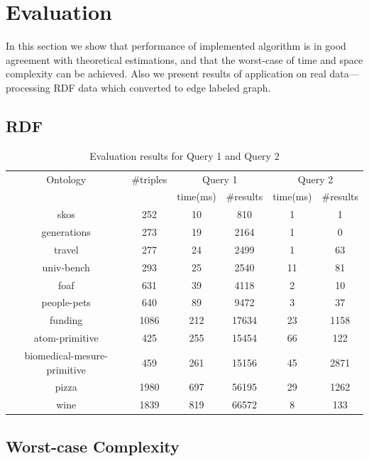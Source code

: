 \section{Evaluation}

In this section we show that performance of implemented algorithm is in good agreement with theoretical estimations, and that the worst-case of time and space complexity can be achieved. Also we present results of application on real data---processing RDF data which converted to edge labeled graph.

\subsection{RDF}

\begin{table}
\centering
\caption{Evaluation results for Query 1 and Query 2}
\label{tbl1}

\begin{tabular}{ | c | c | c | c | c | c |}
\hline
Ontology & \#triples & \multicolumn{2}{|c|}{Query 1} & \multicolumn{2}{|c|}{Query 2} \\
\cline{3-6}
& & time(ms) & \#results & time(ms) & \#results \\
\hline 
\hline
skos        & 252 & 10 & 810 & 1 & 1 \\
generations & 273 & 19 & 2164 & 1 & 0 \\
travel      & 277 & 24 & 2499 & 1 & 63 \\
univ-bench  & 293 & 25 & 2540 & 11 & 81 \\
foaf        & 631 & 39 & 4118 & 2 & 10 \\
people-pets & 640 & 89 & 9472 & 3 & 37 \\
funding     & 1086 & 212 & 17634 & 23 & 1158 \\
atom-primitive & 425 & 255 & 15454 & 66 & 122 \\
biomedical-mesure-primitive & 459 & 261 & 15156 & 45 & 2871 \\
pizza       & 1980 & 697 & 56195 & 29 & 1262 \\
wine        & 1839 & 819 & 66572 & 8 & 133 \\
\hline
\end{tabular}

\end{table}

\subsection{Worst-case Complexity} 

